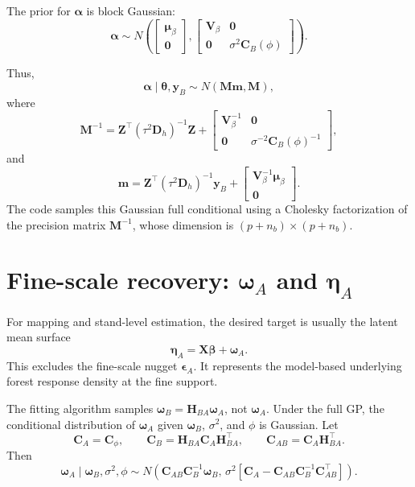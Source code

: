 \documentclass[11pt]{article}
\newcommand{\bsy}{\bm{y}}
\newcommand{\bsb}{\bm{\beta}}
\newcommand{\bsw}{\bm{\omega}}
\newcommand{\bse}{\bm{\epsilon}}
\newcommand{\bstheta}{\bm{\theta}}
\begin{document}
The prior for $\bm{\alpha}$ is block Gaussian:
\begin{equation}
\bm{\alpha}
\sim
N\left(
\begin{bmatrix}
\bm{\mu}_{\beta}\\
\bm{0}
\end{bmatrix},
\begin{bmatrix}
\bm{V}_{\beta} & \bm{0}\\
\bm{0} & \sigma^2\bm{C}_B(\phi)
\end{bmatrix}
\right).
\label{eq:alpha_prior}
\end{equation}

Thus,
\begin{equation}
\bm{\alpha}\mid \bstheta,\bsy_B
\sim
N(\bm{M}\bm{m},\bm{M}),
\label{eq:alpha_cond}
\end{equation}
where
\begin{equation}
\bm{M}^{-1}
=
\bm{Z}^{\top}(\tau^2\bm{D}_h)^{-1}\bm{Z}
+
\begin{bmatrix}
\bm{V}_{\beta}^{-1} & \bm{0}\\
\bm{0} & \sigma^{-2}\bm{C}_B(\phi)^{-1}
\end{bmatrix},
\label{eq:M_inv}
\end{equation}
and
\begin{equation}
\bm{m}
=
\bm{Z}^{\top}(\tau^2\bm{D}_h)^{-1}\bsy_B
+
\begin{bmatrix}
\bm{V}_{\beta}^{-1}\bm{\mu}_{\beta}\\
\bm{0}
\end{bmatrix}.
\label{eq:m_vec}
\end{equation}
The code samples this Gaussian full conditional using a Cholesky factorization of the precision matrix $\bm{M}^{-1}$, whose dimension is $(p+n_b)\times(p+n_b)$.

\section{Fine-scale recovery: $\bsw_A$ and $\bm{\eta}_A$}

For mapping and stand-level estimation, the desired target is usually the latent mean surface
\begin{equation}
\bm{\eta}_A
=
\bm{X}\bsb+\bsw_A.
\label{eq:eta_A}
\end{equation}
This excludes the fine-scale nugget $\bse_A$. It represents the model-based underlying forest response density at the fine support.

The fitting algorithm samples $\bsw_B=\bm{H}_{BA}\bsw_A$, not $\bsw_A$. Under the full GP, the conditional distribution of $\bsw_A$ given $\bsw_B$, $\sigma^2$, and $\phi$ is Gaussian. Let
\begin{equation}
\bm{C}_A = \bm{C}_{\phi},
\qquad
\bm{C}_B = \bm{H}_{BA}\bm{C}_A\bm{H}_{BA}^{\top},
\qquad
\bm{C}_{AB} = \bm{C}_A\bm{H}_{BA}^{\top}.
\label{eq:CA_CB_CAB}
\end{equation}
Then
\begin{equation}
\bsw_A \mid \bsw_B,\sigma^2,\phi
\sim
N\left(
\bm{C}_{AB}\bm{C}_B^{-1}\bsw_B,\,
\sigma^2\left[
\bm{C}_A
-
\bm{C}_{AB}\bm{C}_B^{-1}\bm{C}_{AB}^{\top}
\right]
\right).
\label{eq:wA_cond}
\end{equation}
\end{document}
